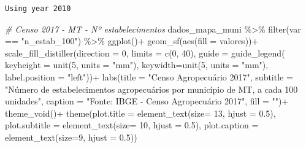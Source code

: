 \documentclass[
  brazilian,
]{book}
\newenvironment{Shaded}{\begin{snugshade}}{\end{snugshade}}
\newcommand{\AttributeTok}[1]{\textcolor[rgb]{0.77,0.63,0.00}{#1}}
\newcommand{\CommentTok}[1]{\textcolor[rgb]{0.56,0.35,0.01}{\textit{#1}}}
\newcommand{\DecValTok}[1]{\textcolor[rgb]{0.00,0.00,0.81}{#1}}
\newcommand{\FloatTok}[1]{\textcolor[rgb]{0.00,0.00,0.81}{#1}}
\newcommand{\FunctionTok}[1]{\textcolor[rgb]{0.00,0.00,0.00}{#1}}
\newcommand{\NormalTok}[1]{#1}
\newcommand{\SpecialCharTok}[1]{\textcolor[rgb]{0.00,0.00,0.00}{#1}}
\newcommand{\StringTok}[1]{\textcolor[rgb]{0.31,0.60,0.02}{#1}}
\begin{document}
\begin{verbatim}
Using year 2010
\end{verbatim}

\begin{Shaded}
\begin{Highlighting}[]
\CommentTok{\# Censo 2017 {-} MT {-} Nº estabelecimentos}
\NormalTok{dados\_mapa\_muni }\SpecialCharTok{\%\textgreater{}\%} 
  \FunctionTok{filter}\NormalTok{(var }\SpecialCharTok{==} \StringTok{"n\_estab\_100"}\NormalTok{) }\SpecialCharTok{\%\textgreater{}\%}
  \FunctionTok{ggplot}\NormalTok{()}\SpecialCharTok{+}
  \FunctionTok{geom\_sf}\NormalTok{(}\FunctionTok{aes}\NormalTok{(}\AttributeTok{fill =}\NormalTok{ valores))}\SpecialCharTok{+}
  \FunctionTok{scale\_fill\_distiller}\NormalTok{(}\AttributeTok{direction =} \DecValTok{0}\NormalTok{,}
                       \AttributeTok{limits =} \FunctionTok{c}\NormalTok{(}\DecValTok{0}\NormalTok{, }\DecValTok{40}\NormalTok{),}
                       \AttributeTok{guide =} \FunctionTok{guide\_legend}\NormalTok{(}
                         \AttributeTok{keyheight =} \FunctionTok{unit}\NormalTok{(}\DecValTok{5}\NormalTok{, }\AttributeTok{units =} \StringTok{"mm"}\NormalTok{),}
                         \AttributeTok{keywidth=}\FunctionTok{unit}\NormalTok{(}\DecValTok{5}\NormalTok{, }\AttributeTok{units =} \StringTok{"mm"}\NormalTok{),}
                         \AttributeTok{label.position =} \StringTok{"left"}\NormalTok{))}\SpecialCharTok{+}
  \FunctionTok{labs}\NormalTok{(}\AttributeTok{title =} \StringTok{"Censo Agropecuário 2017"}\NormalTok{,}
       \AttributeTok{subtitle =} \StringTok{"Número de estabelecimentos agropecuários por município de MT, a cada 100 unidades"}\NormalTok{,}
       \AttributeTok{caption =} \StringTok{"Fonte: IBGE {-} Censo Agropecuário 2017"}\NormalTok{,}
       \AttributeTok{fill =} \StringTok{""}\NormalTok{)}\SpecialCharTok{+}
  \FunctionTok{theme\_void}\NormalTok{()}\SpecialCharTok{+}
  \FunctionTok{theme}\NormalTok{(}\AttributeTok{plot.title =} \FunctionTok{element\_text}\NormalTok{(}\AttributeTok{size=} \DecValTok{13}\NormalTok{, }\AttributeTok{hjust =} \FloatTok{0.5}\NormalTok{),}
        \AttributeTok{plot.subtitle =} \FunctionTok{element\_text}\NormalTok{(}\AttributeTok{size=} \DecValTok{10}\NormalTok{, }\AttributeTok{hjust =} \FloatTok{0.5}\NormalTok{),}
        \AttributeTok{plot.caption =} \FunctionTok{element\_text}\NormalTok{(}\AttributeTok{size=}\DecValTok{9}\NormalTok{, }\AttributeTok{hjust =} \FloatTok{0.5}\NormalTok{))}
\end{Highlighting}
\end{Shaded}
\end{document}
